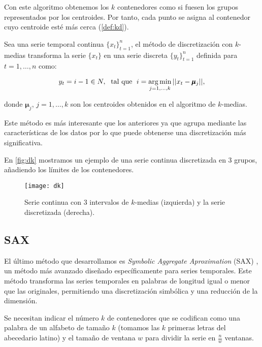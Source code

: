 Con este algoritmo obtenemos los $k$ contenedores como si fuesen los grupos representados por los centroides. Por tanto, cada punto se asigna al contenedor cuyo centroide esté más cerca (\autoref{def:kd}).

\begin{definicion}
  Sea una serie temporal continua $\{x_t\}_{t = 1}^n$, el método de discretización con $k$-medias transforma la serie $\{x_t\}$ en una serie discreta $\{y_t\}_{t = 1}^n$ definida para $t = 1, \ldots, n$ como:

  $$y_t = i-1 \in N, \; \text{ tal que } \; i = \operatorname*{arg\,min} \limits_{j = 1, \ldots, k} ||x_t - \pmb\mu_j||,$$

  donde $\pmb \mu_j$, $j = 1, \ldots, k$ son los centroides obtenidos en el algoritmo de $k$-medias.
  \label{def:kd}
\end{definicion}

Este método es más interesante que los anteriores ya que agrupa mediante las características de los datos por lo que puede obtenerse una discretización más significativa.

En \autoref{fig:dk} mostramos un ejemplo de una serie continua discretizada en 3 grupos, añadiendo los límites de los contenedores.

\begin{figure}[htpb]
  \centering
  \texttt{[image: dk]}
  \caption{Serie continua con 3 intervalos de $k$-medias (izquierda) y la serie discretizada (derecha).}
  \label{fig:dk}
\end{figure}

\subsection{SAX}

El último método que desarrollamos es \emph{Symbolic Aggregate Aproximation} (SAX) \cite{lin2007experiencing}, un método más avanzado diseñado específicamente para series temporales. Este método transforma las series temporales en palabras de longitud igual o menor que las originales, permitiendo una discretización simbólica y una reducción de la dimensión.

Se necesitan indicar el número $k$ de contenedores que se codifican como una palabra de un alfabeto de tamaño $k$ (tomamos las $k$ primeras letras del abecedario latino) y el tamaño de ventana $w$ para dividir la serie en $\frac{n}{w}$ ventanas.

